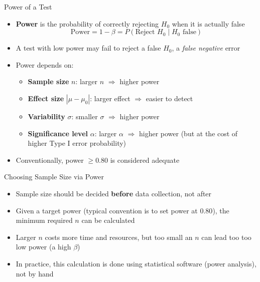 \documentclass[12pt, aspectratio=169]{beamer}
\begin{document}
    \begin{frame}{Power of a Test}
        \begin{itemize}
            \item \textbf{Power} is the probability of correctly rejecting $H_0$
                when it is actually false
            \[
                \text{Power} = 1 - \beta = P(\text{Reject } H_0 \mid H_0 \text{ false})
            \]
            \item A test with low power may fail to reject a false \(H_0\), a \emph{false negative} error
            \item Power depends on:
            \begin{itemize}
                \item \textbf{Sample size} $n$: larger $n$ $\Rightarrow$ higher power
                \item \textbf{Effect size} $|\mu - \mu_0|$: larger effect $\Rightarrow$ easier to detect
                \item \textbf{Variability} $\sigma$: smaller $\sigma$ $\Rightarrow$ higher power
                \item \textbf{Significance level} $\alpha$: larger $\alpha$ $\Rightarrow$ higher power (but at the cost of higher Type I error probability)
            \end{itemize}
            \item Conventionally, power $\geqslant 0.80$ is considered adequate
        \end{itemize}
    \end{frame}


    \begin{frame}{Choosing Sample Size via Power}
        \begin{itemize}
            \item Sample size should be decided \textbf{before} data collection, not after
            \item Given a target power (typical convention is to set power at $0.80$), the minimum required $n$ can be calculated
            \item Larger $n$ costs more time and resources, but too small an $n$ can lead too too low power (a high $\beta$)
            \item In practice, this calculation is done using statistical software (power analysis), not by hand
        \end{itemize}
    \end{frame}
\end{document}

